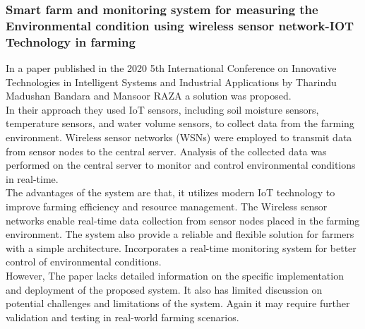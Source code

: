 \documentclass[12pt, a4paper]{article}
\begin{document}
\subsubsection{Smart farm and monitoring system for measuring the Environmental condition using wireless sensor network-IOT Technology in farming}
In a paper published in the 2020 5th International Conference on Innovative Technologies in Intelligent Systems and Industrial Applications by Tharindu Madushan Bandara and Mansoor RAZA a solution was proposed.\\
In their approach they used IoT sensors, including soil moisture sensors, temperature sensors, and
water volume sensors, to collect data from the farming environment.  Wireless sensor networks (WSNs) were employed to transmit data from sensor nodes to the central server. Analysis of the collected data was performed on the central server to monitor and control environmental conditions in real-time.\\
The advantages of the system are that, it utilizes modern IoT technology to improve farming efficiency and resource management. The Wireless sensor networks enable real-time data collection from sensor nodes placed in the farming environment. The system also provide a reliable and flexible solution for farmers with a simple architecture. Incorporates a real-time monitoring system for better control of environmental conditions.\\
However, The paper lacks detailed information on the specific implementation and deployment of the
proposed system. It also has limited discussion on potential challenges and limitations of the system.
Again it may require further validation and testing in real-world farming scenarios.
\end{document}
